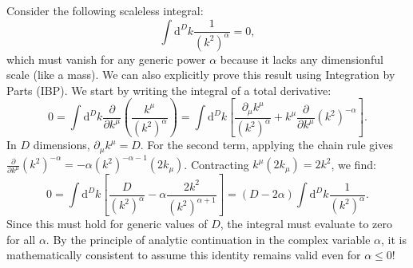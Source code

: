\begin{example}
    Consider the following scaleless integral:
    \[
        \int \mathrm{d}^D k \frac{1}{(k^2)^{\alpha}} = 0,
    \]
    which must vanish for any generic power $\alpha$ because it lacks any dimensionful scale (like a mass).
    We can also explicitly prove this result using Integration by Parts (IBP). We start by writing the integral of a total derivative:
    \[
        0 = \int \mathrm{d}^D k \frac{\partial}{\partial k^\mu} \left( \frac{k^\mu}{(k^2)^\alpha} \right) = \int \mathrm{d}^D k \left[ \frac{\partial_\mu k^\mu}{(k^2)^\alpha} + k^\mu \frac{\partial}{\partial k^\mu} (k^2)^{-\alpha} \right].
    \]
    In $D$ dimensions, $\partial_\mu k^\mu = D$. For the second term, applying the chain rule gives $\frac{\partial}{\partial k^\mu} (k^2)^{-\alpha} = -\alpha (k^2)^{-\alpha-1} (2k_\mu)$. Contracting $k^\mu (2k_\mu) = 2k^2$, we find:
    \[
        0 = \int \mathrm{d}^D k \left[ \frac{D}{(k^2)^\alpha} - \alpha \frac{2k^2}{(k^2)^{\alpha+1}} \right] = (D - 2\alpha) \int \mathrm{d}^D k \frac{1}{(k^2)^\alpha}.
    \]
    Since this must hold for generic values of $D$, the integral must evaluate to zero for all $\alpha$. By the principle of analytic continuation in the complex variable $\alpha$, it is mathematically consistent to assume this identity remains valid even for $\alpha \leq 0$!
\end{example}

